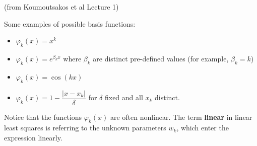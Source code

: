\documentclass[12pt,letterpaper,noanswers]{exam}
\begin{document}





    
    
    

\begin{tcolorbox}
(from Koumoutsakos et al Lecture 1)

Some examples of possible basis functions:
\begin{itemize}
\itemsep0pt
    \item $\varphi_k(x)=x^{k}$
    \item $\varphi_k(x)=e^{\beta_k x}$ where $\beta_k$ are distinct pre-defined values (for example, $\beta_k = k$)
    \item $\varphi_k(x) = \cos\left(k x\right)$
    \item $\varphi_k(x) = 1 -\dfrac{\vert x - x_k\vert}{\delta}$ for $\delta$ fixed and all $x_k$ distinct.
\end{itemize}

Notice that the functions $\varphi_k(x)$ are often nonlinear.  The term \textbf{linear} in linear least squares is referring to the unknown parameters $w_k$, which enter the expression linearly.
\end{tcolorbox}
\end{document}
